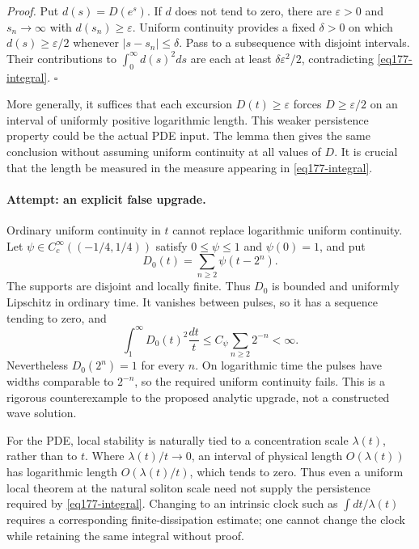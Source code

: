 \documentclass[11pt,a4paper]{article}
\newcommand{\eps}{\varepsilon}
\numberwithin{equation}{section}
\begin{document}
\textit{Proof.} Put $d(s)=D(e^s)$. If $d$ does not tend to zero, there
are $\eps>0$ and $s_n\to\infty$ with $d(s_n)\ge\eps$.
Uniform continuity provides a fixed $\delta>0$ on which
$d(s)\ge\eps/2$ whenever $|s-s_n|\le\delta$. Pass to a subsequence with
disjoint intervals. Their contributions to $\int_0^\infty d(s)^2ds$
are each at least $\delta\eps^2/2$, contradicting
\eqref{eq177-integral}. \hfill$\square$

More generally, it suffices that each excursion $D(t)\ge\eps$ forces
$D\ge\eps/2$ on an interval of uniformly positive logarithmic length.
This weaker persistence property could be the actual PDE input. The lemma
then gives the same conclusion without assuming uniform continuity at all
values of $D$. It is crucial that the length be measured in the measure
appearing in \eqref{eq177-integral}.

\paragraph{Attempt: an explicit false upgrade.}
Ordinary uniform continuity in $t$ cannot replace logarithmic uniform
continuity. Let $\psi\in C_c^\infty((-1/4,1/4))$ satisfy
$0\le\psi\le1$ and $\psi(0)=1$, and put
\[
                    D_0(t)=\sum_{n\ge2}\psi(t-2^n).
\]
The supports are disjoint and locally finite. Thus $D_0$ is bounded and
uniformly Lipschitz in ordinary time. It vanishes between pulses, so it has
a sequence tending to zero, and
\[
 \int_1^\infty D_0(t)^2\frac{dt}{t}
       \le C_\psi\sum_{n\ge2}2^{-n}<\infty.
\]
Nevertheless $D_0(2^n)=1$ for every $n$. On logarithmic time the pulses
have widths comparable to $2^{-n}$, so the required uniform continuity
fails. This is a rigorous counterexample to the proposed analytic upgrade,
not a constructed wave solution.

For the PDE, local stability is naturally tied to a concentration scale
$\lambda(t)$, rather than to $t$. Where $\lambda(t)/t\to0$, an interval
of physical length $O(\lambda(t))$ has logarithmic length
$O(\lambda(t)/t)$, which tends to zero. Thus even a uniform local theorem
at the natural soliton scale need not supply the persistence required by
\eqref{eq177-integral}. Changing to an intrinsic clock such as
$\int dt/\lambda(t)$ requires a corresponding finite-dissipation estimate;
one cannot change the clock while retaining the same integral without proof.
\end{document}
